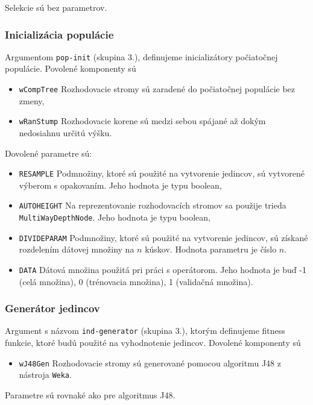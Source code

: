 Selekcie sú bez parametrov.

\subsubsection*{Inicializácia populácie}
Argumentom \verb|pop-init| (skupina 3.), definujeme inicializátory počiatočnej populácie.
Povolené komponenty sú 
\begin{itemize}
\item \verb|wCompTree| Rozhodovacie stromy sú zaradené do počiatočnej populácie bez zmeny,
\item \verb|wRanStump| Rozhodovacie korene sú medzi sebou spájané až dokým nedosiahnu určitú výšku.
\end{itemize}

Dovolené parametre sú:
\begin{itemize}
\item \verb|RESAMPLE| Podmnožiny, ktoré sú použité na vytvorenie jedincov, sú vytvorené výberom s opakovaním. Jeho hodnota je typu boolean,
\item \verb|AUTOHEIGHT| Na reprezentovanie rozhodovacích stromov sa použije trieda \verb|MultiWayDepthNode|. Jeho hodnota je typu boolean,
\item \verb|DIVIDEPARAM| Podmnožiny, ktoré sú použité na vytvorenie jedincov, sú získané rozdelením dátovej množiny na $n$ kúskov. Hodnota parametru je číslo $n$.
\item \verb|DATA| Dátová množina použitá pri práci s operátorom. Jeho hodnota je buď -1 (celá množina), 0 (trénovacia množina), 1 (validačná množina).
\end{itemize}

\subsubsection*{Generátor jedincov}
Argument s názvom \verb|ind-generator| (skupina 3.), ktorým definujeme fitness funkcie, ktoré budú použité na vyhodnotenie jedincov.
Dovolené komponenty sú 
\begin{itemize}
\item \verb|wJ48Gen| Rozhodovacie stromy sú generované pomocou algoritmu J48 z nástroja \verb|Weka|.
\end{itemize}

Parametre sú rovnaké ako pre algoritmus J48.